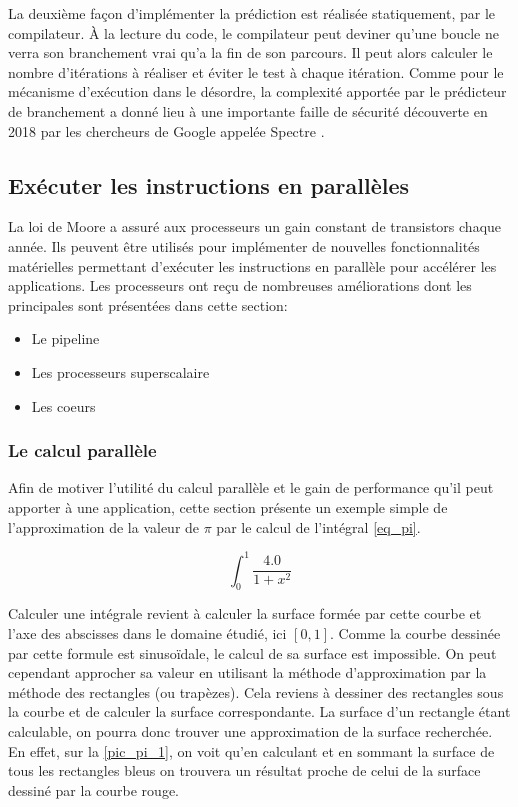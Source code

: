 La deuxième façon d'implémenter la prédiction est réalisée statiquement, par le compilateur. À la lecture du code, le compilateur peut deviner qu'une boucle ne verra son branchement vrai qu'a la fin de son parcours. Il peut alors calculer le nombre d’itérations à réaliser et éviter le test à chaque itération.
Comme pour le mécanisme d'exécution dans le désordre, la complexité apportée par le prédicteur de branchement a donné lieu à une importante faille de sécurité découverte en 2018 par les chercheurs de Google appelée Spectre \cite{kocher2018spectre}.






\subsection{Exécuter les instructions en parallèles} \label{sec:para}

La loi de Moore a assuré aux processeurs un gain constant de transistors chaque année. Ils peuvent être utilisés pour implémenter de nouvelles fonctionnalités matérielles permettant d'exécuter les instructions en parallèle pour accélérer les applications. Les processeurs ont reçu de nombreuses améliorations dont les principales sont présentées dans cette section: 
\begin{itemize}
    \item Le pipeline
    \item Les processeurs superscalaire
    \item Les coeurs
\end{itemize}


\subsubsection{Le calcul parallèle}
Afin de motiver l'utilité du calcul parallèle et le gain de performance qu'il peut apporter à une application, cette section présente un exemple simple de l'approximation de la valeur de $\pi$ par le calcul de l'intégral \ref{eq_pi}.

\begin{equation} \label{eq_pi} 
\int_{0}^{1} \frac{4.0}{1 + x^{2}} 
\end{equation}

Calculer une intégrale revient à calculer la surface formée par cette courbe et l'axe des abscisses dans le domaine étudié, ici $[0,1]$. Comme la courbe dessinée par cette formule est sinusoïdale, le calcul de sa surface est impossible. On peut cependant approcher sa valeur en utilisant la méthode d'approximation par la méthode des rectangles (ou trapèzes). Cela reviens à dessiner des rectangles sous la courbe et de calculer la surface correspondante. La surface d'un rectangle étant calculable, on pourra donc trouver une approximation de la surface recherchée. En effet, sur la \autoref{pic_pi_1}, on voit qu'en calculant et en sommant la surface de tous les rectangles bleus on trouvera un résultat proche de celui de la surface dessiné par la courbe rouge.


